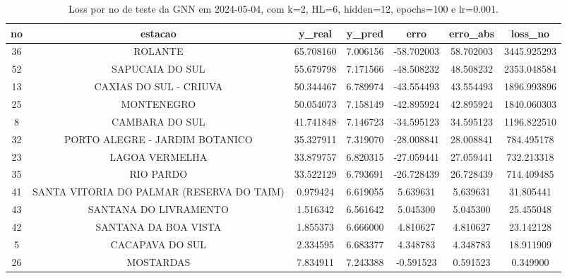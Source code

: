 \begin{table}[h]
\centering
\caption{Loss por no de teste da GNN em 2024-05-04, com k=2, HL=6, hidden=12, epochs=100 e lr=0.001.}
\label{tab:gnn_loss_k2_hl6_h12_e100_d20240504}
\begin{tabular}{ccccccc}
\toprule
no & estacao & y\_real & y\_pred & erro & erro\_abs & loss\_no \\
\midrule
36 & ROLANTE & 65.708160 & 7.006156 & -58.702003 & 58.702003 & 3445.925293 \\
52 & SAPUCAIA DO SUL & 55.679798 & 7.171566 & -48.508232 & 48.508232 & 2353.048584 \\
13 & CAXIAS DO SUL - CRIUVA & 50.344467 & 6.789974 & -43.554493 & 43.554493 & 1896.993896 \\
25 & MONTENEGRO & 50.054073 & 7.158149 & -42.895924 & 42.895924 & 1840.060303 \\
8 & CAMBARA DO SUL & 41.741848 & 7.146723 & -34.595123 & 34.595123 & 1196.822510 \\
32 & PORTO ALEGRE - JARDIM BOTANICO & 35.327911 & 7.319070 & -28.008841 & 28.008841 & 784.495178 \\
23 & LAGOA VERMELHA & 33.879757 & 6.820315 & -27.059441 & 27.059441 & 732.213318 \\
35 & RIO PARDO & 33.522129 & 6.793691 & -26.728439 & 26.728439 & 714.409485 \\
41 & SANTA VITORIA DO PALMAR (RESERVA DO TAIM) & 0.979424 & 6.619055 & 5.639631 & 5.639631 & 31.805441 \\
43 & SANTANA DO LIVRAMENTO & 1.516342 & 6.561642 & 5.045300 & 5.045300 & 25.455048 \\
42 & SANTANA DA BOA VISTA & 1.855373 & 6.666000 & 4.810627 & 4.810627 & 23.142128 \\
5 & CACAPAVA DO SUL & 2.334595 & 6.683377 & 4.348783 & 4.348783 & 18.911909 \\
26 & MOSTARDAS & 7.834911 & 7.243388 & -0.591523 & 0.591523 & 0.349900 \\
\bottomrule
\end{tabular}
\end{table}
